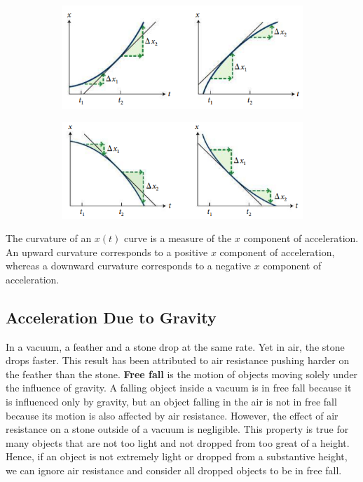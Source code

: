         \begin{figure}[hbt!]
            \centering
            \caption*{\textbf{Position-versus-time graphs for objects accelerating along the positive $\bm{x}$ axis:}}
            \begin{subfigure}[b]{.45\textwidth}
                \includegraphics[scale=1]{Resources/Position_Time_Graph_Acceleration}
            \end{subfigure}
            \begin{subfigure}[b]{.45\textwidth}
                \includegraphics[scale=1]{Resources/Position_Time_Graph_Acceleration2}
            \end{subfigure}
        \end{figure}

        The curvature of an $x(t)$ curve is a measure of the $x$ component of acceleration. An upward curvature corresponds to a positive $x$ component of acceleration, whereas a downward curvature corresponds to a
        negative $x$ component of acceleration.



    \subsection{Acceleration Due to Gravity}
        In a vacuum, a feather and a stone drop at the same rate. Yet in air, the stone drops faster. This result has been attributed to air resistance pushing harder on the feather than the stone. \textbf{Free fall} is
        the motion of objects moving solely under the influence of gravity. A falling object inside a vacuum is in free fall because it is influenced only by gravity, but an object falling in the air is not in free fall
        because its motion is also affected by air resistance. However, the effect of air resistance on a stone outside of a vacuum is negligible. This property is true for many objects that are not too light and not
        dropped from too great of a height. Hence, if an object is not extremely light or dropped from a substantive height, we can ignore air resistance and consider all dropped objects to be in free fall. \\

